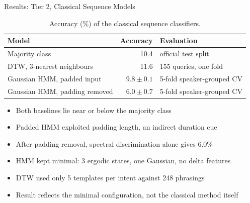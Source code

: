 \documentclass[aspectratio=169,10pt,xcolor=table]{beamer}
\begin{document}
\begin{frame}{Results: Tier 2, Classical Sequence Models}
\begin{table}
\caption{Accuracy (\%) of the classical sequence classifiers.}
\small
\begin{tabular}{@{}lrl@{}}
\toprule
Model & Accuracy & Evaluation\\
\midrule
Majority class & 10.4 & official test split\\
DTW, 3-nearest neighbours & 11.6 & 155 queries, one fold\\
Gaussian HMM, padded input & $9.8 \pm 0.1$ & 5-fold speaker-grouped CV\\
Gaussian HMM, padding removed & $6.0 \pm 0.7$ & 5-fold speaker-grouped CV\\
\bottomrule
\end{tabular}
\end{table}
\begin{itemize}\setlength{\itemsep}{4pt}
\item Both baselines lie near or below the majority class
\item Padded HMM exploited padding length, an indirect duration cue
\item After padding removal, spectral discrimination alone gives 6.0\%
\item HMM kept minimal: 3 ergodic states, one Gaussian, no delta features
\item DTW used only 5 templates per intent against 248 phrasings
\item Result reflects the minimal configuration, not the classical method itself
\end{itemize}
\end{frame}
\end{document}
